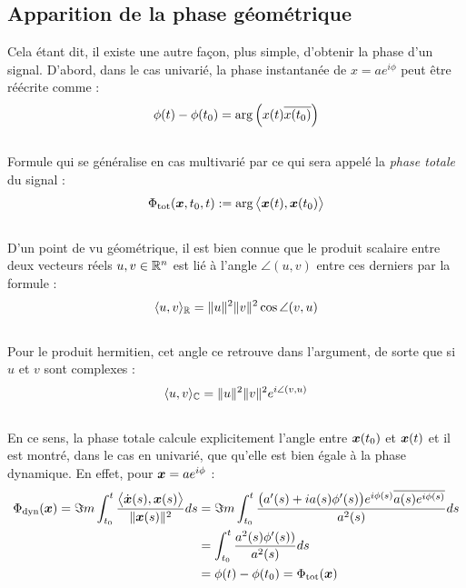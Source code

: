 \subsection{Apparition de la phase géométrique}\label{subsec:intro_phaseg}

Cela étant dit, il existe une autre façon, plus simple, d'obtenir la phase d'un signal. D'abord, dans le cas univarié, la phase instantanée de $x=ae^{i\phi}$ peut être réécrite comme :
\[\phi(t)-\phi(t_0)  = \arg\left( x(t) \overline{x(t_0)} \right)\]
\\
Formule qui se généralise en cas multivarié par ce qui sera appelé la \emph{phase totale} du signal :
\begin{equation}\label{eq:phase_t}
	\Phi_{\text{\normalfont tot}}(\boldsymbol{x}, t_0, t) := \arg\big\langle \boldsymbol{x}(t), \boldsymbol{x}(t_0)\big\rangle
\end{equation}
\\
D'un point de vu géométrique, il est bien connue que le produit scalaire entre deux vecteurs réels $u,v\in\mathbb{R}^n$ est lié à l'angle $\angle(u,v)$ entre ces derniers par la formule :
\[\langle u,v\rangle_{\mathbb{R}} = \|u\|^2 \|v\|^2 \cos \angle(v,u)\]
\\
Pour le produit hermitien, cet angle ce retrouve dans l'argument, de sorte que si $u$ et $v$ sont complexes :
\[\langle u,v\rangle_{\mathbb{C}} = \|u\|^2 \|v\|^2 e^{i \angle(v,u)}\]
\\
En ce sens, la phase totale calcule explicitement l'angle entre $\boldsymbol{x}(t_0)$ et $\boldsymbol{x}(t)$ et il est montré, dans le cas en univarié, que qu'elle est bien égale à la phase dynamique. En effet, pour $\boldsymbol{x} = ae^{i\phi}$ :
\begin{align*}
	\Phi_{\text{\normalfont dyn}}(\boldsymbol{x}) = \Im m\int_{t_0}^t \frac{\big\langle \dot{\boldsymbol{x}}(s) , \boldsymbol{x}(s) \big\rangle}{\|\boldsymbol{x}(s)\|^2} ds &= \Im m \int_{t_0}^t \frac{\big(a'(s) + ia(s)\phi'(s) \big) e^{i\phi(s)} \overline{a(s) e^{i\phi(s)}}}{a^2(s)} ds \\
	&= \int_{t_0}^t \frac{a^2(s)\phi'(s))}{a^2(s)} ds \\
	&= \phi(t) - \phi(t_0) = \Phi_{\text{\normalfont tot}}(\boldsymbol{x})
\end{align*}
\skipl

